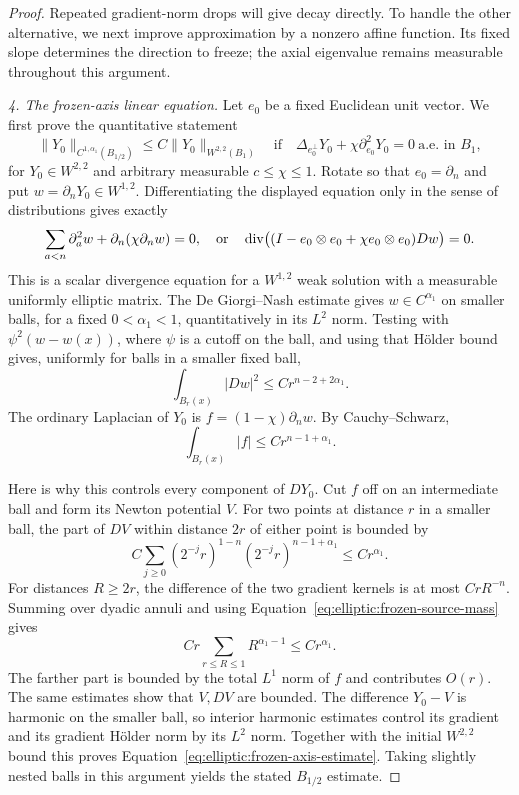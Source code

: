 \begin{proof}
Repeated gradient-norm drops will give decay directly.  To handle the
other alternative, we next improve approximation by a nonzero affine
function.  Its fixed slope determines the direction to freeze; the
axial eigenvalue remains measurable throughout this argument.

\medskip\noindent
\emph{4. The frozen-axis linear equation.}
Let $e_0$ be a fixed Euclidean unit vector.  We first prove the quantitative
statement
\begin{equation}
 \|Y_0\|_{C^{1,\alpha_1}(B_{1/2})}
      \leq C\|Y_0\|_{W^{2,2}(B_1)}
 \quad\text{if}\quad
 \Delta_{e_0^\perp}Y_0+\chi\partial_{e_0}^2Y_0=0
 \ \text{a.e. in }B_1,
 \label{eq:elliptic:frozen-axis-estimate}
\end{equation}
for $Y_0\in W^{2,2}$ and arbitrary measurable $c\leq\chi\leq1$.
Rotate so that $e_0=\partial_n$ and put $w=\partial_nY_0\in W^{1,2}$.
Differentiating the displayed equation only in the sense of distributions
gives exactly
\begin{equation}
 \sum_{a<n}\partial_a^2w+\partial_n(\chi\partial_nw)=0,
 \quad\text{or}\quad
 \operatorname{div}\bigl((I-e_0\otimes e_0+\chi e_0\otimes e_0)Dw\bigr)=0.
 \label{eq:elliptic:frozen-derivative-divergence}
\end{equation}
This is a scalar divergence equation for a $W^{1,2}$ weak solution with
a measurable uniformly elliptic matrix.  The De Giorgi--Nash estimate
gives $w\in C^{\alpha_1}$ on smaller balls, for a fixed
$0<\alpha_1<1$, quantitatively in its $L^2$ norm.  Testing with
$\psi^2(w-w(x))$, where $\psi$ is a cutoff on the ball, and using that
H\"older bound gives, uniformly for balls in a smaller fixed ball,
\begin{equation}
 \int_{B_r(x)}|Dw|^2\leq C r^{n-2+2\alpha_1}.
 \label{eq:elliptic:frozen-derivative-morrey}
\end{equation}
The ordinary Laplacian of $Y_0$ is
$f=(1-\chi)\partial_nw$.  By Cauchy--Schwarz,
\begin{equation}
 \int_{B_r(x)}|f|\leq C r^{n-1+\alpha_1}.
 \label{eq:elliptic:frozen-source-mass}
\end{equation}

Here is why this controls every component of $DY_0$.  Cut $f$ off on
an intermediate ball and form its Newton potential $V$.  For two points
at distance $r$ in a smaller ball, the part of $DV$ within distance
$2r$ of either point is bounded by
\[
 C\sum_{j\geq0}(2^{-j}r)^{1-n}(2^{-j}r)^{n-1+\alpha_1}
       \leq Cr^{\alpha_1}.
\]
For distances $R\geq2r$, the difference of the two gradient kernels is
at most $CrR^{-n}$.  Summing over dyadic annuli and using
Equation~\eqref{eq:elliptic:frozen-source-mass} gives
\[
 Cr\sum_{r\leq R\leq1}R^{\alpha_1-1}
       \leq Cr^{\alpha_1}.
\]
The farther part is bounded by the total $L^1$ norm of $f$ and contributes
$O(r)$.  The same estimates show that $V,DV$ are bounded.  The difference
$Y_0-V$ is harmonic on the smaller ball, so interior harmonic estimates
control its gradient and its gradient H\"older norm by its $L^2$ norm.
Together with the initial $W^{2,2}$ bound this proves
Equation~\eqref{eq:elliptic:frozen-axis-estimate}.  Taking slightly nested
balls in this argument yields the stated $B_{1/2}$ estimate.


\end{proof}
